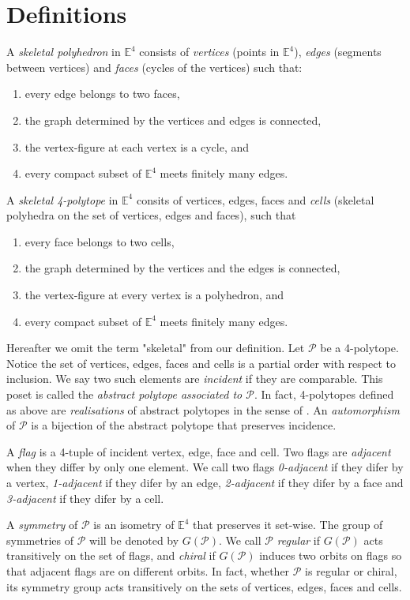 \documentclass[spanish]{article}
\theoremstyle{definition}
\newcommand{\E}{\mathbb{E}}
\newcommand{\p}{\mathcal{P}}
\begin{document}
	\section{Definitions}
	A \textit{skeletal polyhedron} in $\E^4$ consists of \textit{vertices} (points in $\E^4$), \textit{edges} (segments between vertices) and \textit{faces} (cycles of the vertices) such that:
	\begin{enumerate}
		\item every edge belongs to two faces,
		\item the graph determined by the vertices and edges is connected,
		\item the vertex-figure at each vertex is a cycle, and
		\item every compact subset of $\E^4$ meets finitely many edges.
	\end{enumerate}
	A \textit{skeletal 4-polytope} in $\E^4$ consits of vertices, edges, faces and \textit{cells} (skeletal polyhedra on the set of vertices, edges and faces), such that
	\begin{enumerate}
		\item every face belongs to two cells,
		\item the graph determined by the vertices and the edges is connected,
		\item the vertex-figure at every vertex is a polyhedron, and
		\item every compact subset of $\E^4$ meets finitely many edges.
		\end{enumerate}
	
	Hereafter we omit the term "skeletal" from our definition. Let $\p$ be a 4-polytope. Notice the set of vertices, edges, faces and cells is a partial order with respect to inclusion. We say two such elements are \textit{incident} if they are comparable. This poset is called the \textit{abstract polytope associated to $\p$}. In fact, 4-polytopes defined as above are \textit{realisations} of abstract polytopes in the sense of \cite{abstract-polytopes}. An \textit{automorphism} of $\p$ is a bijection of the abstract polytope that preserves incidence.
	
	A \textit{flag} is a 4-tuple of incident vertex, edge, face and cell. Two flags are \textit{adjacent} when they differ by only one element. We call two flags \textit{0-adjacent} if they difer by a vertex, \textit{1-adjacent} if they difer by an edge, \textit{2-adjacent} if they difer by a face and \textit{3-adjacent} if they difer by a cell.
	
	A \textit{symmetry} of $\p$ is an isometry of $\E^4$ that preserves it set-wise. The group of symmetries of $\p$ will be denoted by $G(\p)$. We call $\p$ \textit{regular} if $G(\p)$ acts transitively on the set of flags, and \textit{chiral} if $G(\p)$ induces two orbits on flags so that adjacent flags are on different orbits. In fact, whether $\p$ is regular or chiral, its symmetry group acts transitively on the sets of vertices, edges, faces and cells.
	
\end{document}
